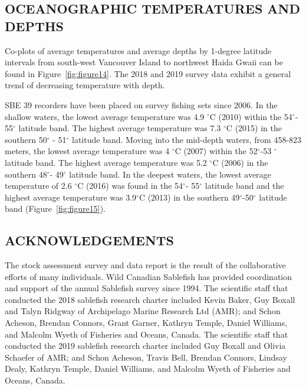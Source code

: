 \documentclass[12pt]{article}\usepackage[]{graphicx}\usepackage[]{color}
\begin{document}
\hypertarget{oceanographic-temperatures-and-depths}{%
\subsection{OCEANOGRAPHIC TEMPERATURES AND DEPTHS}\label{oceanographic-temperatures-and-depths}}

Co-plots of average temperatures and average depths by 1-degree latitude intervals from south-west Vancouver Island to northwest Haida Gwaii can be found in Figure~\ref{fig:figure14}. The 2018 and 2019 survey data exhibit a general trend of decreasing temperature with depth.

SBE 39 recorders have been placed on survey fishing sets since 2006. In the shallow waters, the lowest average temperature was 4.9 \(^\circ\)C (2010) within the 54\(^\circ\)- 55\(^\circ\) latitude band. The highest average temperature was 7.3 \(^\circ\)C (2015) in the southern 50\(^\circ\) - 51\(^\circ\) latitude band. Moving into the mid-depth waters, from 458-823 meters, the lowest average temperature was 4 \(^\circ\)C (2007) within the 52\(^\circ\)-53 \(^\circ\) latitude band. The highest average temperature was 5.2 \(^\circ\)C (2006) in the southern 48\(^\circ\)- 49\(^\circ\) latitude band. In the deepest waters, the lowest average temperature of 2.6 \(^\circ\)C (2016) was found in the 54\(^\circ\)- 55\(^\circ\) latitude band and the highest average temperature was 3.9\(^\circ\)C (2013) in the southern 49\(^\circ\)-50\(^\circ\) latitude band (Figure~\ref{fig:figure15}).

\hypertarget{acknowledgements}{%
\subsection{ACKNOWLEDGEMENTS}\label{acknowledgements}}

The stock assessment survey and data report is the result of the collaborative efforts of many individuals. Wild Canadian Sablefish has provided coordination and support of the annual Sablefish survey since 1994. The scientific staff that conducted the 2018 sablefish research charter included Kevin Baker, Guy Boxall and Talyn Ridgway of Archipelago Marine Research Ltd (AMR); and Schon Acheson, Brendan Connors, Grant Garner, Kathryn Temple, Daniel Williams, and Malcolm Wyeth of Fisheries and Oceans, Canada. The scientific staff that conducted the 2019 sablefish research charter included Guy Boxall and Olivia Schaefer of AMR; and Schon Acheson, Travis Bell, Brendan Connors, Lindsay Dealy, Kathryn Temple, Daniel Williams, and Malcolm Wyeth of Fisheries and Oceans, Canada.
\end{document}
